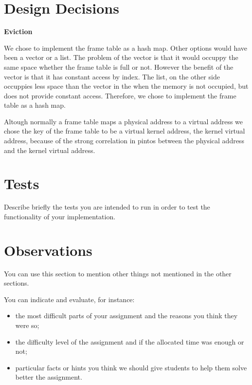 \begin{lstlisting}

\end{lstlisting}

\section{Design Decisions}

\textbf{Eviction}

We chose to implement the frame table as a hash map. Other options would have been a vector or a list. The problem of the vector is that it would occuppy the same space whether the frame table is full or not. However the benefit of the vector is that it has constant access by index. The list, on the other side occuppies less space than the vector in the when the memory is not occupied, but does not provide constant access. Therefore, we chose to implement the frame table as a hash map.

Altough normally a frame table maps a physical address to a virtual address we chose the key of the frame table to be a virtual kernel address, the kernel virtual address, because of the strong correlation in pintos between the physical address and the kernel virtual address.

\section{Tests}

Describe briefly the tests you are intended to run in order to test the functionality of your implementation.

\section{Observations}

You can use this section to mention other things not mentioned in the other sections. 

You can indicate and evaluate, for instance:
\begin{itemize}
	\item the most difficult parts of your assignment and the reasons you think they were so; 
	
	\item the difficulty level of the assignment and if the allocated time was enough or not; 

	\item particular facts or hints you think we should give students to help them solve better the assignment.

\end{itemize}

